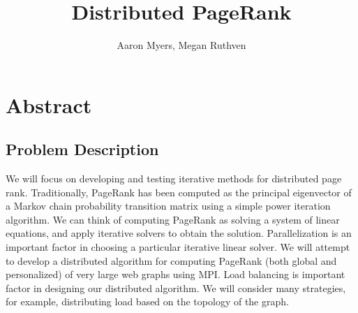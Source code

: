 \documentclass[a4paper,10pt]{article}
\title{Distributed PageRank}
\author{Aaron Myers, Megan Ruthven}
\begin{document}
\maketitle
\pagebreak
\section{Abstract}
\subsection{Problem Description}
We will focus on developing and testing iterative methods for distributed page rank. Traditionally, PageRank has been computed as the principal eigenvector of a Markov chain probability transition matrix using a simple power iteration algorithm. We can think of computing PageRank as solving a system of linear equations, and apply iterative solvers to obtain the solution. Parallelization is an important factor in choosing a particular iterative linear solver. We will attempt to develop a distributed algorithm for computing PageRank (both global and personalized) of very large web graphs using MPI. Load balancing is important factor in designing our distributed algorithm. We will consider many strategies, for example, distributing load based on the topology of the graph.
\end{document}
